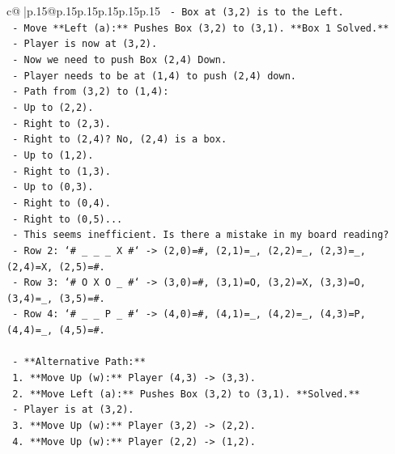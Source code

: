 \documentclass{article}
\begin{document}
{\begin{supertabular}{c@{$\;$}|p{.15\linewidth}@{}p{.15\linewidth}p{.15\linewidth}p{.15\linewidth}p{.15\linewidth}p{.15\linewidth}}
{{{\texttt{            {-} Box at (3,2) is to the Left.} \\
\texttt{            {-} Move **Left (a):** Pushes Box (3,2) to (3,1). **Box 1 Solved.**} \\
\texttt{            {-} Player is now at (3,2).} \\
\texttt{            {-} Now we need to push Box (2,4) Down.} \\
\texttt{            {-} Player needs to be at (1,4) to push (2,4) down.} \\
\texttt{            {-} Path from (3,2) to (1,4):} \\
\texttt{                {-} Up to (2,2).} \\
\texttt{                {-} Right to (2,3).} \\
\texttt{                {-} Right to (2,4)? No, (2,4) is a box.} \\
\texttt{                {-} Up to (1,2).} \\
\texttt{                {-} Right to (1,3).} \\
\texttt{                {-} Up to (0,3).} \\
\texttt{                {-} Right to (0,4).} \\
\texttt{                {-} Right to (0,5)...} \\
\texttt{            {-} This seems inefficient. Is there a mistake in my board reading?} \\
\texttt{            {-} Row 2: `\# \_ \_ \_ X \#` {-}> (2,0)=\#, (2,1)=\_, (2,2)=\_, (2,3)=\_, (2,4)=X, (2,5)=\#.} \\
\texttt{            {-} Row 3: `\# O X O \_ \#` {-}> (3,0)=\#, (3,1)=O, (3,2)=X, (3,3)=O, (3,4)=\_, (3,5)=\#.} \\
\texttt{            {-} Row 4: `\# \_ \_ P \_ \#` {-}> (4,0)=\#, (4,1)=\_, (4,2)=\_, (4,3)=P, (4,4)=\_, (4,5)=\#.} \\
\\ 
\texttt{    {-} **Alternative Path:**} \\
\texttt{        1.  **Move Up (w):** Player (4,3) {-}> (3,3).} \\
\texttt{        2.  **Move Left (a):** Pushes Box (3,2) to (3,1). **Solved.**} \\
\texttt{            {-} Player is at (3,2).} \\
\texttt{        3.  **Move Up (w):** Player (3,2) {-}> (2,2).} \\
\texttt{        4.  **Move Up (w):** Player (2,2) {-}> (1,2).} \\
}}}
\end{supertabular}}
\end{document}
